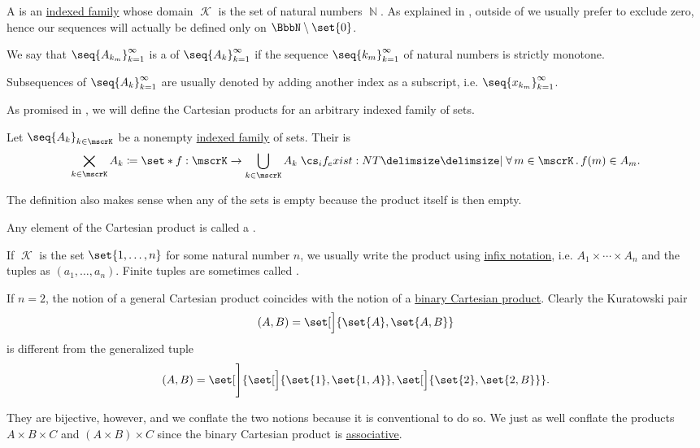 \begin{definition}\label{def:sequence}
  A  is an \hyperref[def:indexed_family]{indexed family} whose domain \( \mscrK \) is the set of natural numbers \( \BbbN \). As explained in , outside of  we usually prefer to exclude zero, hence our sequences will actually be defined only on \( \BbbN \setminus \set{ 0 } \).

  We say that \( \seq{ A_{k_m} }_{k=1}^\infty \) is a  of \( \seq{ A_k }_{k=1}^\infty \) if the sequence \( \seq{ k_m }_{k=1}^\infty \) of natural numbers is strictly monotone.

  Subsequences of \( \seq{ A_k }_{k=1}^\infty \) are usually denoted by adding another index as a subscript, i.e. \( \seq{ x_{k_m} }_{k=1}^\infty \).
\end{definition}

\begin{definition}\label{def:cartesian_product}
  As promised in , we will define the Cartesian products for an arbitrary indexed family of sets.

  Let \( \seq{ A_k }_{k \in \mscrK} \) be a nonempty \hyperref[def:indexed_family]{indexed family} of sets. Their  is
  \begin{equation}\label{eq:def:cartesian_product}
    \bigtimes_{k \in \mscrK} A_k \coloneqq \set*{ f: \mscrK \to \bigcup_{k \in \mscrK} A_k \given* \qforall{m \in \mscrK} f(m) \in A_m }.
  \end{equation}

  The definition also makes sense when any of the sets is empty because the product itself is then empty.

  Any element of the Cartesian product is called a .

  If \( \mscrK \) is the set \( \set{ 1, \ldots, n } \) for some natural number \( n \), we usually write the product using \hyperref[rem:first_order_formula_conventions/infix]{infix notation}, i.e. \( A_1 \times \cdots \times A_n \) and the tuples as \( (a_1, \ldots, a_n) \). Finite tuples are sometimes called .

  If \( n = 2 \), the notion of a general Cartesian product coincides with the notion of a \hyperref[def:binary_cartesian_product]{binary Cartesian product}. Clearly the Kuratowski pair
  \begin{equation*}
    (A, B) = \set[\Big]{ \set{ A }, \set{ A, B } }
  \end{equation*}
  is different from the generalized tuple
  \begin{equation*}
    (A, B) = \set[\Bigg]{ \set[\Big]{ \set{ 1 }, \set{ 1, A } }, \set[\Big]{ \set{ 2 }, \set{ 2, B } } }.
  \end{equation*}

  They are bijective, however, and we conflate the two notions because it is conventional to do so. We just as well conflate the products \( A \times B \times C \) and \( (A \times B) \times C \) since the binary Cartesian product is \hyperref[def:magma/associative]{associative}.
\end{definition}

